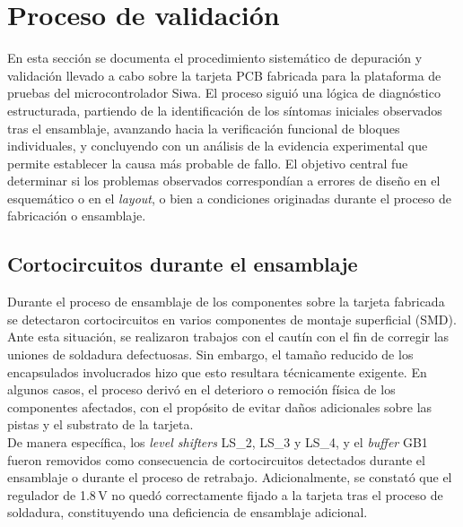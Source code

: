 \documentclass[journal,trans]{IEEEtran}
\begin{document}
\section{Proceso de validación}


En esta sección se documenta el procedimiento sistemático de depuración y validación 
llevado a cabo sobre la tarjeta PCB fabricada para la plataforma de pruebas del
microcontrolador Siwa. El proceso siguió una lógica de diagnóstico estructurada, partiendo
de la identificación de los síntomas iniciales observados tras el ensamblaje, avanzando
hacia la verificación funcional de bloques
individuales, y concluyendo con un análisis de la evidencia experimental que
permite establecer la causa más probable de fallo. El objetivo central fue determinar si
los problemas observados correspondían a errores de diseño en el esquemático o en el
\textit{layout}, o bien a condiciones originadas durante el proceso de fabricación o ensamblaje.

\subsection{Cortocircuitos durante el ensamblaje}

Durante el proceso de ensamblaje de los componentes sobre la tarjeta fabricada se detectaron
cortocircuitos en varios componentes de montaje superficial (SMD). Ante esta situación, se realizaron trabajos
con el cautín con el fin de corregir las uniones de soldadura defectuosas.
Sin embargo, el tamaño reducido de los encapsulados involucrados 
hizo que esto resultara técnicamente exigente. En algunos casos,
el proceso derivó en el deterioro o remoción física de los componentes afectados, con el
propósito de evitar daños adicionales sobre las pistas y el substrato de la tarjeta.\\

De manera específica, los \textit{level shifters} LS\_2, LS\_3 y LS\_4, y el \textit{buffer} GB1 fueron removidos
como consecuencia de cortocircuitos detectados durante el ensamblaje o durante el proceso
de retrabajo. Adicionalmente, se constató que el regulador de 1.8\,V no quedó correctamente
fijado a la tarjeta tras el proceso de soldadura, constituyendo una deficiencia de ensamblaje adicional.
\end{document}
